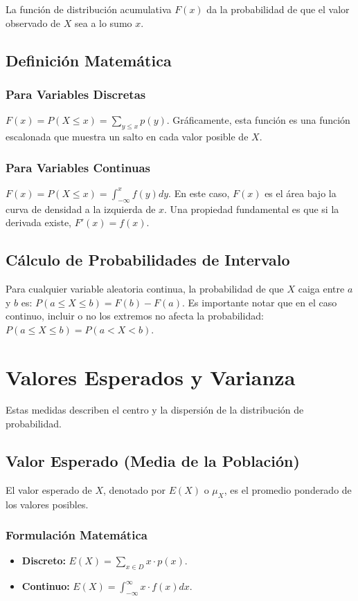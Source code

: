 \documentclass[a4paper]{article}
\begin{document}
La función de distribución acumulativa $F(x)$ da la probabilidad de que el valor observado de $X$ sea a lo sumo $x$.

\subsection{Definición Matemática}

\subsubsection{Para Variables Discretas}
$F(x) = P(X \leq x) = \sum_{y \leq x} p(y)$.
Gráficamente, esta función es una función escalonada que muestra un salto en cada valor posible de $X$.

\subsubsection{Para Variables Continuas}
$F(x) = P(X \leq x) = \int_{-\infty}^{x} f(y) dy$.
En este caso, $F(x)$ es el área bajo la curva de densidad a la izquierda de $x$. Una propiedad fundamental es que si la derivada existe, $F'(x) = f(x)$.

\subsection{Cálculo de Probabilidades de Intervalo}

Para cualquier variable aleatoria continua, la probabilidad de que $X$ caiga entre $a$ y $b$ es:
$P(a \leq X \leq b) = F(b) - F(a)$.
Es importante notar que en el caso continuo, incluir o no los extremos no afecta la probabilidad: $P(a \leq X \leq b) = P(a < X < b)$.

\section{Valores Esperados y Varianza}

Estas medidas describen el centro y la dispersión de la distribución de probabilidad.

\subsection{Valor Esperado (Media de la Población)}

El valor esperado de $X$, denotado por $E(X)$ o $\mu_X$, es el promedio ponderado de los valores posibles.

\subsubsection{Formulación Matemática}
\begin{itemize}
    \item \textbf{Discreto:} $E(X) = \sum_{x \in D} x \cdot p(x)$.
    \item \textbf{Continuo:} $E(X) = \int_{-\infty}^{\infty} x \cdot f(x) dx$.
\end{itemize}
\end{document}
